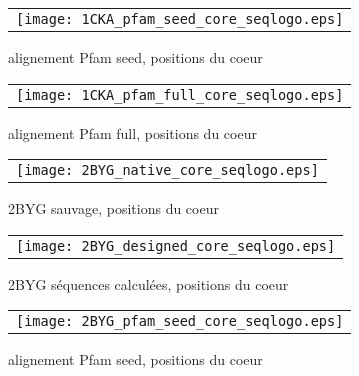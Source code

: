     \begin{figure}[h]
      \centering
      \begin{tabular}{c} 
        \texttt{[image: 1CKA\_pfam\_seed\_core\_seqlogo.eps]} \\
      \end{tabular}
        
      \caption{alignement Pfam seed, positions du coeur}
\label{}
    \end{figure}

    \begin{figure}[h]
      \centering
      \begin{tabular}{c} 
        \texttt{[image: 1CKA\_pfam\_full\_core\_seqlogo.eps]} \\
      \end{tabular}
        
      \caption{alignement Pfam full, positions du coeur}
\label{}
    \end{figure}


    \clearpage



    \clearpage

    \begin{figure}[h]
      \centering
      \begin{tabular}{c} 
        \texttt{[image: 2BYG\_native\_core\_seqlogo.eps]} \\
      \end{tabular}
        
      \caption{2BYG sauvage, positions du coeur}
\label{}
    \end{figure}

    \begin{figure}[h]
      \centering
      \begin{tabular}{c} 
        \texttt{[image: 2BYG\_designed\_core\_seqlogo.eps]} \\
      \end{tabular}
        
      \caption{2BYG séquences calculées, positions du coeur}
\label{}
    \end{figure}

    \begin{figure}[h]
      \centering
      \begin{tabular}{c} 
        \texttt{[image: 2BYG\_pfam\_seed\_core\_seqlogo.eps]} \\
      \end{tabular}
        
      \caption{alignement Pfam seed, positions du coeur}
\label{}
    \end{figure}

